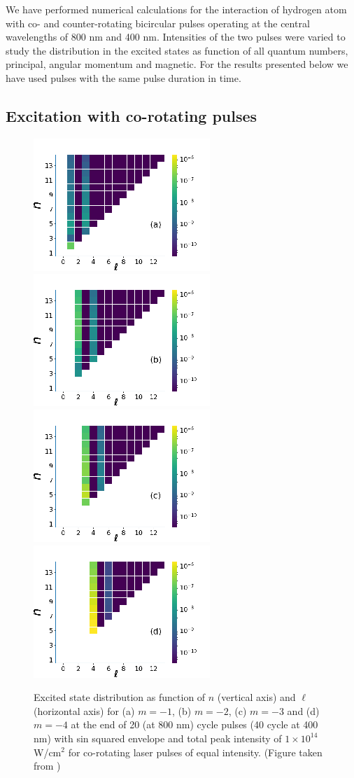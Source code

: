 
We have performed numerical calculations for the interaction of hydrogen atom with co- and counter-rotating bicircular pulses operating at the central wavelengths of 800 nm and 400 nm. Intensities of the two pulses were varied to study the distribution in the excited states as function of all quantum numbers, principal, angular momentum and magnetic. For the results presented below we have used pulses with the same pulse duration in time.  



\subsection{Excitation with co-rotating pulses}

\begin{figure}[!ht]
\centering
\includegraphics[width=0.24\columnwidth]{figs/Rydberg/Gebre-bicircular-Fig1a.png}
\includegraphics[width=0.24\columnwidth]{figs/Rydberg/Gebre-bicircular-Fig1b.png}
\includegraphics[width=0.24\columnwidth]{figs/Rydberg/Gebre-bicircular-Fig1c.png}
\includegraphics[width=0.24\columnwidth]{figs/Rydberg/Gebre-bicircular-Fig1d.png}
\caption{\label{fig:co-nl-distribution}
Excited state distribution as function of $n$ (vertical axis) and $\ell$ (horizontal axis) for (a) $m = -1$, (b) $m=-2$, (c) $m=-3$ and (d) $m=-4$ at the end of 20 (at 800 nm) cycle pulses (40 cycle at 400 nm) with sin squared envelope and total peak intensity of $1\times10^{14}$ W/cm$^2$ for co-rotating laser pulses of equal intensity. (Figure taken from \cite{venzke2020_ryd})
}
\end{figure}

